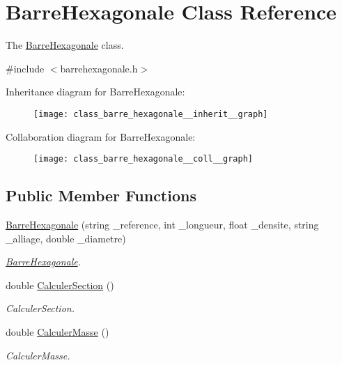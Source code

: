 \hypertarget{class_barre_hexagonale}{}\section{Barre\+Hexagonale Class Reference}
\label{class_barre_hexagonale}


The \hyperlink{class_barre_hexagonale}{Barre\+Hexagonale} class.  




{\ttfamily \#include $<$barrehexagonale.\+h$>$}



Inheritance diagram for Barre\+Hexagonale\+:
\nopagebreak
\begin{figure}[H]
\begin{center}
\leavevmode
\texttt{[image: class\_barre\_hexagonale\_\_inherit\_\_graph]}
\end{center}
\end{figure}


Collaboration diagram for Barre\+Hexagonale\+:
\nopagebreak
\begin{figure}[H]
\begin{center}
\leavevmode
\texttt{[image: class\_barre\_hexagonale\_\_coll\_\_graph]}
\end{center}
\end{figure}
\subsection*{Public Member Functions}
\begin{DoxyCompactItemize}
\item 
\hyperlink{class_barre_hexagonale_a2d9337f0f27d17941747999db696f024}{Barre\+Hexagonale} (string \+\_\+reference, int \+\_\+longueur, float \+\_\+densite, string \+\_\+alliage, double \+\_\+diametre)
\begin{DoxyCompactList}\small\item\em \hyperlink{class_barre_hexagonale}{Barre\+Hexagonale}. \end{DoxyCompactList}\item 
double \hyperlink{class_barre_hexagonale_a7b8d80473167ecc5b91ce19d7105390e}{Calculer\+Section} ()
\begin{DoxyCompactList}\small\item\em Calculer\+Section. \end{DoxyCompactList}\item 
double \hyperlink{class_barre_hexagonale_a8036fd825b12f3bf34dc82e61345b865}{Calculer\+Masse} ()
\begin{DoxyCompactList}\small\item\em Calculer\+Masse. \end{DoxyCompactList}\end{DoxyCompactItemize}
